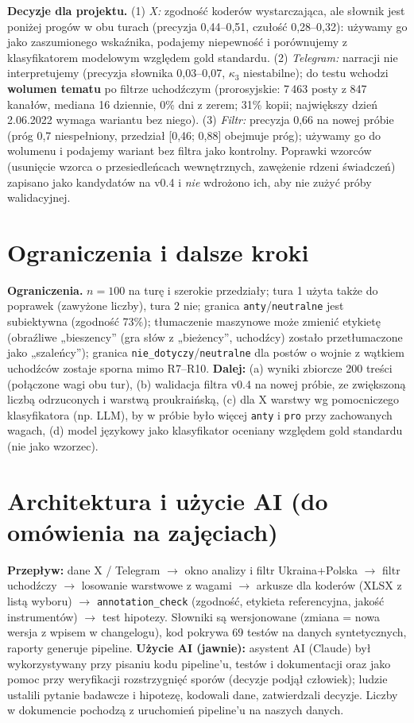 \documentclass[10pt,a4paper]{article}
\begin{document}
\textbf{Decyzje dla projektu.}
(1) \emph{X:} zgodność koderów wystarczająca, ale słownik jest poniżej progów w obu turach (precyzja 0,44--0,51, czułość 0,28--0,32): używamy go jako zaszumionego wskaźnika, podajemy niepewność i porównujemy z klasyfikatorem modelowym względem gold standardu.
(2) \emph{Telegram:} narracji nie interpretujemy (precyzja słownika 0,03--0,07, $\kappa_3$ niestabilne); do testu wchodzi \textbf{wolumen tematu} po filtrze uchodźczym (prorosyjskie: 7\,463 posty z 847 kanałów, mediana 16 dziennie, 0\% dni z zerem; 31\% kopii; największy dzień 2.06.2022 wymaga wariantu bez niego).
(3) \emph{Filtr:} precyzja 0,66 na nowej próbie (próg 0,7 niespełniony, przedział [0,46; 0,88] obejmuje próg); używamy go do wolumenu i podajemy wariant bez filtra jako kontrolny. Poprawki wzorców (usunięcie wzorca o przesiedleńcach wewnętrznych, zawężenie rdzeni świadczeń) zapisano jako kandydatów na v0.4 i \emph{nie} wdrożono ich, aby nie zużyć próby walidacyjnej.

\section{Ograniczenia i dalsze kroki}
\textbf{Ograniczenia.} $n=100$ na turę i szerokie przedziały; tura 1 użyta także do poprawek (zawyżone liczby), tura 2 nie; granica \texttt{anty}/\texttt{neutralne} jest subiektywna (zgodność 73\%); tłumaczenie maszynowe może zmienić etykietę (obraźliwe „bieszency” (gra słów z „bieżency”, uchodźcy) zostało przetłumaczone jako „szaleńcy”); granica \texttt{nie\_dotyczy}/\texttt{neutralne} dla postów o wojnie z wątkiem uchodźców zostaje sporna mimo R7--R10.
\textbf{Dalej:} (a) wyniki zbiorcze 200 treści (połączone wagi obu tur), (b) walidacja filtra v0.4 na nowej próbie, ze zwiększoną liczbą odrzuconych i warstwą proukraińską, (c) dla X warstwy wg pomocniczego klasyfikatora (np. LLM), by w próbie było więcej \texttt{anty} i \texttt{pro} przy zachowanych wagach, (d) model językowy jako klasyfikator oceniany względem gold standardu (nie jako wzorzec).

\section{Architektura i użycie AI (do omówienia na zajęciach)}
\textbf{Przepływ:} dane X / Telegram $\to$ okno analizy i filtr Ukraina+Polska $\to$ filtr uchodźczy $\to$ losowanie warstwowe z wagami $\to$ arkusze dla koderów (XLSX z listą wyboru) $\to$ \texttt{annotation\_check} (zgodność, etykieta referencyjna, jakość instrumentów) $\to$ test hipotezy. Słowniki są wersjonowane (zmiana = nowa wersja z wpisem w changelogu), kod pokrywa 69 testów na danych syntetycznych, raporty generuje pipeline.
\textbf{Użycie AI (jawnie):} asystent AI (Claude) był wykorzystywany przy pisaniu kodu pipeline'u, testów i dokumentacji oraz jako pomoc przy weryfikacji rozstrzygnięć sporów (decyzje podjął człowiek); ludzie ustalili pytanie badawcze i hipotezę, kodowali dane, zatwierdzali decyzje. Liczby w dokumencie pochodzą z uruchomień pipeline'u na naszych danych.
\end{document}
